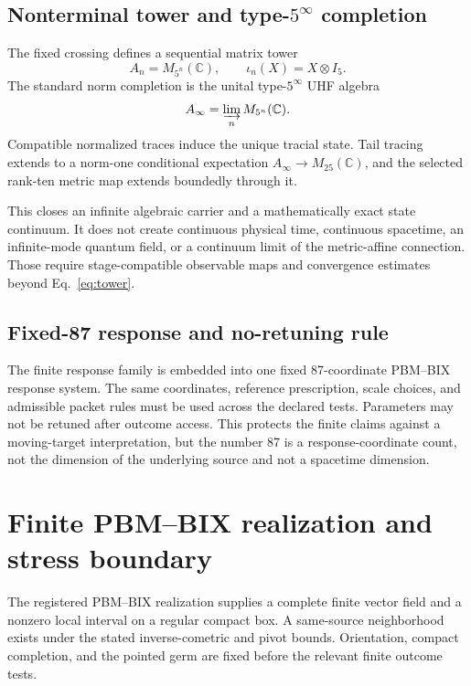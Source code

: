 \documentclass[12pt,a4paper,twoside]{article}
\begin{document}
\subsection{Nonterminal tower and type-$5^\infty$ completion}

The fixed crossing defines a sequential matrix tower
\begin{equation}
A_n=M_{5^n}(\mathbb C),
\qquad
\iota_n(X)=X\otimes I_5.
\label{eq:tower}
\end{equation}
The standard norm completion is the unital type-$5^\infty$ UHF algebra
\begin{equation}
A_\infty=\varinjlim_n M_{5^n}(\mathbb C).
\end{equation}
Compatible normalized traces induce the unique tracial state. Tail tracing extends to a norm-one conditional expectation $A_\infty\to M_{25}(\mathbb C)$, and the selected rank-ten metric map extends boundedly through it.

This closes an infinite algebraic carrier and a mathematically exact state continuum. It does not create continuous physical time, continuous spacetime, an infinite-mode quantum field, or a continuum limit of the metric-affine connection. Those require stage-compatible observable maps and convergence estimates beyond Eq.~\eqref{eq:tower}.

\subsection{Fixed-87 response and no-retuning rule}

The finite response family is embedded into one fixed 87-coordinate PBM--BIX response system. The same coordinates, reference prescription, scale choices, and admissible packet rules must be used across the declared tests. Parameters may not be retuned after outcome access. This protects the finite claims against a moving-target interpretation, but the number 87 is a response-coordinate count, not the dimension of the underlying source and not a spacetime dimension.

\section{Finite PBM--BIX realization and stress boundary}

The registered PBM--BIX realization supplies a complete finite vector field and a nonzero local interval on a regular compact box. A same-source neighborhood exists under the stated inverse-cometric and pivot bounds. Orientation, compact completion, and the pointed germ are fixed before the relevant finite outcome tests.
\end{document}
